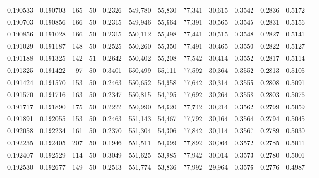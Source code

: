 \begin{tabular}{rrrrrrrrrrrrr}
0.190533 & 0.190703 &   165 &  50 &                                     0.2326 & 549,780 &  55,830 &  77,341 &  30,615 & 0.3542 & 0.2836 & 0.5172 \\
0.190703 & 0.190856 &   166 &  50 &                                     0.2315 & 549,946 &  55,664 &  77,391 &  30,565 & 0.3545 & 0.2831 & 0.5156 \\
0.190856 & 0.191028 &   166 &  50 &                                     0.2315 & 550,112 &  55,498 &  77,441 &  30,515 & 0.3548 & 0.2827 & 0.5141 \\
0.191029 & 0.191187 &   148 &  50 &                                     0.2525 & 550,260 &  55,350 &  77,491 &  30,465 & 0.3550 & 0.2822 & 0.5127 \\
0.191188 & 0.191325 &   142 &  51 &                                     0.2642 & 550,402 &  55,208 &  77,542 &  30,414 & 0.3552 & 0.2817 & 0.5114 \\
0.191325 & 0.191422 &    97 &  50 &                                     0.3401 & 550,499 &  55,111 &  77,592 &  30,364 & 0.3552 & 0.2813 & 0.5105 \\
0.191424 & 0.191570 &   153 &  50 &                                     0.2463 & 550,652 &  54,958 &  77,642 &  30,314 & 0.3555 & 0.2808 & 0.5091 \\
0.191570 & 0.191716 &   163 &  50 &                                     0.2347 & 550,815 &  54,795 &  77,692 &  30,264 & 0.3558 & 0.2803 & 0.5076 \\
0.191717 & 0.191890 &   175 &  50 &                                     0.2222 & 550,990 &  54,620 &  77,742 &  30,214 & 0.3562 & 0.2799 & 0.5059 \\
0.191891 & 0.192055 &   153 &  50 &                                     0.2463 & 551,143 &  54,467 &  77,792 &  30,164 & 0.3564 & 0.2794 & 0.5045 \\
0.192058 & 0.192234 &   161 &  50 &                                     0.2370 & 551,304 &  54,306 &  77,842 &  30,114 & 0.3567 & 0.2789 & 0.5030 \\
0.192235 & 0.192405 &   207 &  50 &                                     0.1946 & 551,511 &  54,099 &  77,892 &  30,064 & 0.3572 & 0.2785 & 0.5011 \\
0.192407 & 0.192529 &   114 &  50 &                                     0.3049 & 551,625 &  53,985 &  77,942 &  30,014 & 0.3573 & 0.2780 & 0.5001 \\
0.192530 & 0.192677 &   149 &  50 &                                     0.2513 & 551,774 &  53,836 &  77,992 &  29,964 & 0.3576 & 0.2776 & 0.4987 \\

\end{tabular}
